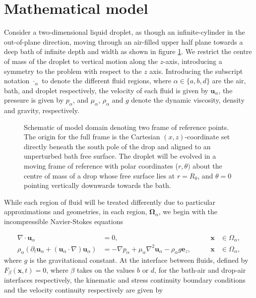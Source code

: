 \section{Mathematical model}\label{sect:Model}


Consider a two-dimensional liquid droplet, as though an infinite-cylinder in the out-of-plane direction, moving through an air-filled upper half plane towards a deep bath of infinite depth and width as shown in figure \ref{fig:figure1}. We restrict the centre of mass of the droplet to vertical motion along the $z$-axis, introducing a symmetry to the problem with respect to the $z$ axis. Introducing the subscript notation $\cdot_\alpha$ to denote the different fluid regions, where $\alpha \in \{a,b,d\}$ are the air, bath, and droplet respectively, the velocity of each fluid is given by $\mathbf{u}_\alpha$, the pressure is given by $p_\alpha$, and $\mu_\alpha$, $\rho_\alpha$ and  $g$ denote the dynamic viscosity, density and gravity, respectively.

\begin{figure}
    \centering
    
    \caption{Schematic of model domain denoting two frame of reference points. The origin for the full frame is the Cartesian $(x,z)$-coordinate set directly beneath the south pole of the drop and aligned to an unperturbed bath free surface. The droplet will be evolved in a moving frame of reference with polar coordinates ($r,\theta)$ about the centre of mass of a drop whose free surface lies at $r=R_0$, and $\theta=0$ pointing vertically downwards towards the bath. }
    \label{fig:figure1}
\end{figure}
While each region of fluid will be treated differently due to particular approximations and geometries, in each region, $\mathbf{\Omega}_\alpha$, we begin with the incompressible Navier-Stokes equations

   \begin{align}\label{eq: mass}
    \nabla \cdot \mathbf{u}_\alpha &=  0, \qquad &\mathbf{x} &\in \Omega_\alpha,\\ \label{eq: mom}
    \rho_\alpha \left(\partial_t \mathbf{u}_\alpha + (\mathbf{u}_\alpha\cdot \nabla)\mathbf{u}_\alpha \right) &= -\nabla p_\alpha + \mu_\alpha \nabla^2 \mathbf{u}_\alpha - \rho_\alpha g \mathbf{e}_z, \qquad & \mathbf{x} &\in \Omega_\alpha,
\end{align}
where $g$ is the gravitational constant.
At the interface between fluids, defined by $F_\beta(\mathbf {x},t)=0$, where $\beta$ takes on the values $b$ or $d$, for the bath-air and drop-air interfaces respectively, the kinematic and stress continuity boundary conditions and the velocity continuity respectively are given by 

